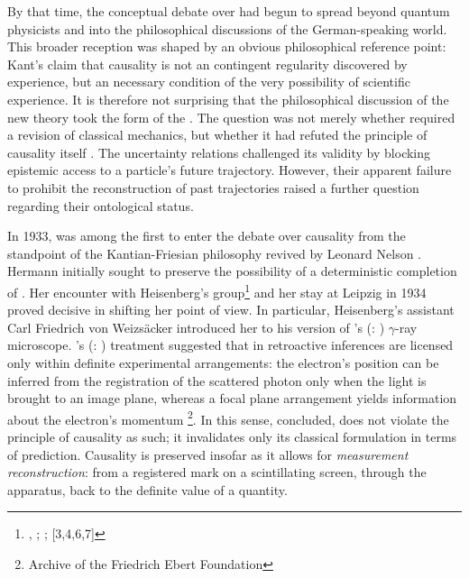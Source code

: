 \documentclass[pdflatex]{sn-jnl}
\renewcommand{\citets}[2][]{\citeauthor{#2}'s (\citeyear{#2}\if\relax\detokenize{#1}\relax\else: #1\fi)}
\newcommand{\vW}{von Weizsäcker\xspace}
\begin{document}
By that time, the conceptual debate over \qm had begun to spread beyond quantum physicists and into the philosophical discussions of the German-speaking world. This broader reception was shaped by an obvious philosophical reference point: Kant's claim that causality is not an \apo contingent regularity discovered by experience, but an \apr necessary condition of the very possibility of scientific experience. It is therefore not surprising that the philosophical discussion of the new theory took the form of the  \citep[2.VI.1]{Mehra2001a}. The question was not merely whether \qm required a revision of classical mechanics, but whether it had refuted the principle of causality itself \citep{Bergmann1929,Frank1932}. The uncertainty relations challenged its validity by blocking epistemic access to a particle's future trajectory. However, their apparent failure to prohibit the reconstruction of past trajectories raised a further question regarding their ontological status.

In 1933, \citet{Hermann1933} was among the first to enter the debate over causality from the standpoint of the Kantian-Friesian philosophy revived by Leonard Nelson \citep{Soler2017}. Hermann initially sought to preserve the possibility of a deterministic completion of \qm. Her encounter with Heisenberg's group\footnote{, ; ; [3,4,6,7]} and her stay at Leipzig in 1934 proved decisive in shifting her point of view. In particular, Heisenberg's assistant Carl Friedrich \vW introduced her to his version of \citets{Heisenberg1927} $\gamma$-ray microscope. \citets{Weizsacker1931} treatment suggested that in \qm retroactive inferences are licensed only within definite experimental arrangements: the electron's position can be inferred from the registration of the scattered photon only when the light is brought to an image plane, whereas a focal plane arrangement yields information about the electron's momentum \footnote{Archive of the Friedrich Ebert Foundation}. In this sense, \citet{Hermann1935} concluded, \qm does not violate the principle of causality as such; it invalidates only its classical formulation in terms of prediction. Causality is preserved insofar as it allows for \emph{measurement reconstruction}: from a registered mark on a scintillating screen, through the apparatus, back to the definite value of a quantity.
\end{document}

